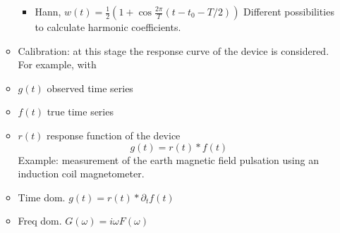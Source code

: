 \begin{enumerate}
\begin{itemize}
    \begin{itemize}
    \tightlist
    \item
      Hann, \(w(t) = \tfrac12 (1 + \cos\tfrac{2\pi}{T}(t - t_0 - T/2))\)
      Different possibilities to calculate harmonic coefficients.
    \end{itemize}
  \item
    Calibration: at this stage the response curve of the device is
    considered. For example, with
  \item
    \(g(t)\) observed time series
  \item
    \(f(t)\) true time series
  \item
    \(r(t)\) response function of the device \[
    g(t) = r(t) \ast f(t)
       \] Example: measurement of the earth magnetic field pulsation
    using an induction coil magnetometer.
  \item
    Time dom. \(g(t) = r(t)\ast \partial_t f(t)\)
  \item
    Freq dom. \(G(\omega) = i\omega F(\omega)\)
  \end{itemize}
\end{enumerate}
